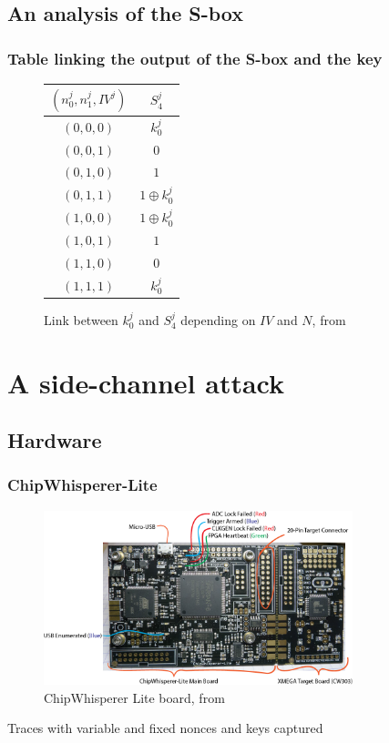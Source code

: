 \documentclass{beamer}
\begin{document}
	\subsection{An analysis of the S-box}
	\begin{frame}
		\frametitle{Table linking the output of the S-box and the key}
		\begin{figure}[h]
			\centering
			\begin{tabular}{|c|c|}
				\hline
				$(n_0^j,n_1^j,IV^j)$&$S_4^j$\\
				\hline\hline
				$(0,0,0)$&$k_0^j$\\
				\hline
				$(0,0,1)$&$0$\\
				\hline
				$(0,1,0)$&$1$\\
				\hline
				$(0,1,1)$&$1 \oplus k_0^j$\\
				\hline
				$(1,0,0)$&$1 \oplus k_0^j$\\
				\hline
				$(1,0,1)$&$1$\\
				\hline
				$(1,1,0)$&$0$\\
				\hline
				$(1,1,1)$&$k_0^j$\\
				\hline
			\end{tabular}
			\caption{Link between $k_0^j$ and $S_4^j$ depending on $IV$ and $N$, from \cite{these}}
			\label{link_k_s4}
		\end{figure}
	\end{frame}
	
	\section{A side-channel attack}
	\subsection{Hardware}
	\begin{frame}
		\frametitle{ChipWhisperer-Lite}
		\begin{figure}[h]
			\raggedright
			\includegraphics[width=0.8\textwidth]{img_files/cwlite_basic1}
			\caption{ChipWhisperer Lite board, from \cite{cwdoc}}
			\label{fig:cw}
		\end{figure}
		Traces with variable and fixed nonces  and keys captured
	\end{frame}
	
\end{document}
